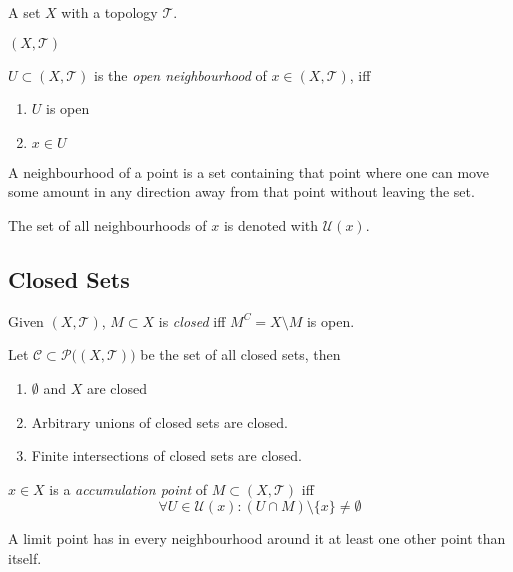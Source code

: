 \begin{definition}
   A set \(X\) with a topology \(\mathcal{T}\).
\end{definition}
\begin{remark}[Notation]
   \((X, \mathcal{T})\)
\end{remark}

\begin{definition}
   \(U \subset (X, \mathcal{T})\) is the \emph{open neighbourhood} of \(x \in (X, \mathcal{T})\), iff
   \begin{enumerate}[label=\roman*, align=Center]
      \item \(U\) is open
      \item \(x \in U\)
   \end{enumerate}
\end{definition}
\begin{remark}[Intuition]
   A neighbourhood of a point is a set containing that point where one can move some amount in any direction away from that point without leaving the set.
\end{remark}
\begin{remark}[Notation]
   The set of all neighbourhoods of \(x\) is denoted with \(\mathcal{U}(x)\).
\end{remark}

\subsection{Closed Sets}
\begin{definition}
   Given \((X, \mathcal{T})\), \(M \subset X\) is \emph{closed} iff \(M^C = X \setminus M\) is open.
\end{definition}

\begin{theorem}\label{thm:closed_sets}
   Let \(\mathcal{C} \subset \mathcal{P}\big((X, \mathcal{T})\big)\) be the set of all closed sets, then
   \begin{enumerate}[label=\roman*, align=Center]
      \item \(\emptyset\) and \(X\) are closed
      \item Arbitrary unions of closed sets are closed.
      \item Finite intersections of closed sets are closed.
   \end{enumerate}
\end{theorem}

\begin{definition}
   \(x \in X\) is a \emph{accumulation point} of \(M \subset (X, \mathcal{T})\) iff
   \[\forall U \in \mathcal{U}(x): (U \cap M) \setminus \{x\} \neq \emptyset\]
\end{definition}
\begin{remark}[Intuition]
   A limit point has in every neighbourhood around it at least one other point than itself.
\end{remark}

